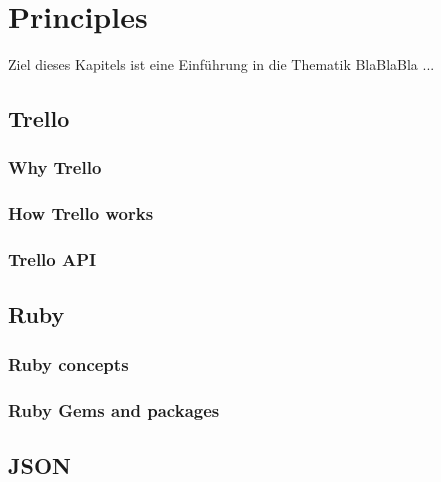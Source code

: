 
\chapter{Principles}
  \label{MatMet}

\noindent
Ziel dieses Kapitels ist eine Einf\"uhrung in die Thematik BlaBlaBla ...

\section{Trello}

\subsection{Why Trello}

\subsection{How Trello works}

\subsection{Trello API}

\section{Ruby}

\subsection{Ruby concepts}

\subsection{Ruby Gems and packages}

\section{JSON}